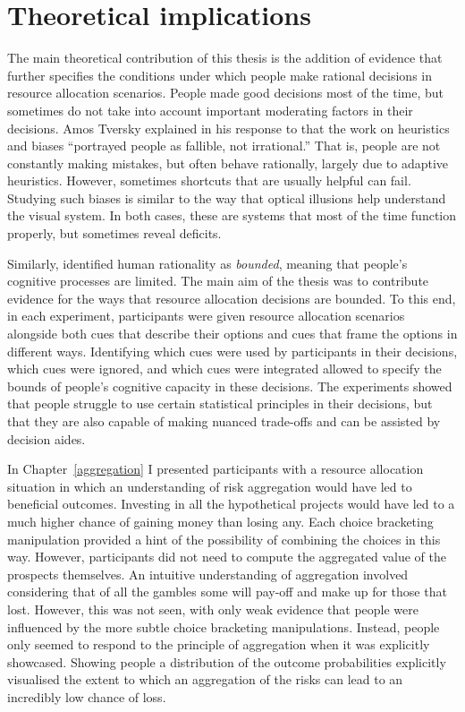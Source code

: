 \documentclass[a4paper, nobind, dvipsnames]{templates/ociamthesis}
\theoremstyle{definition}
\theoremstyle{definition}
\theoremstyle{definition}
\theoremstyle{definition}
\theoremstyle{remark}
\begin{document}
\section{Theoretical implications}

The main theoretical contribution of this thesis is the addition of evidence
that further specifies the conditions under which people make rational decisions
in resource allocation scenarios. People made good decisions most of the time,
but sometimes do not take into account important moderating factors in their
decisions. Amos Tversky explained in his response to \textcite[p.~355]{cohen1981} that
the work on heuristics and biases ``portrayed people as fallible, not
irrational.'' That is, people are not constantly making mistakes, but often
behave rationally, largely due to adaptive heuristics. However, sometimes
shortcuts that are usually helpful can fail. Studying such biases is similar to
the way that optical illusions help understand the visual system. In both cases,
these are systems that most of the time function properly, but sometimes reveal
deficits.

Similarly, \textcite{simon1955} identified human rationality as \emph{bounded}, meaning that
people's cognitive processes are limited. The main aim of the thesis was to
contribute evidence for the ways that resource allocation decisions are bounded.
To this end, in each experiment, participants were given resource allocation
scenarios alongside both cues that describe their options and cues that frame
the options in different ways. Identifying which cues were used by participants
in their decisions, which cues were ignored, and which cues were integrated
allowed to specify the bounds of people's cognitive capacity in these decisions.
The experiments showed that people struggle to use certain statistical
principles in their decisions, but that they are also capable of making nuanced
trade-offs and can be assisted by decision aides.

In Chapter~\ref{aggregation} I presented participants with a resource
allocation situation in which an understanding of risk aggregation would have
led to beneficial outcomes. Investing in all the hypothetical projects would
have led to a much higher chance of gaining money than losing any. Each choice
bracketing manipulation provided a hint of the possibility of combining the
choices in this way. However, participants did not need to compute the
aggregated value of the prospects themselves. An intuitive understanding of
aggregation involved considering that of all the gambles some will pay-off and
make up for those that lost. However, this was not seen, with only weak evidence
that people were influenced by the more subtle choice bracketing manipulations.
Instead, people only seemed to respond to the principle of aggregation when it
was explicitly showcased. Showing people a distribution of the outcome
probabilities explicitly visualised the extent to which an aggregation of the
risks can lead to an incredibly low chance of loss.
\end{document}
